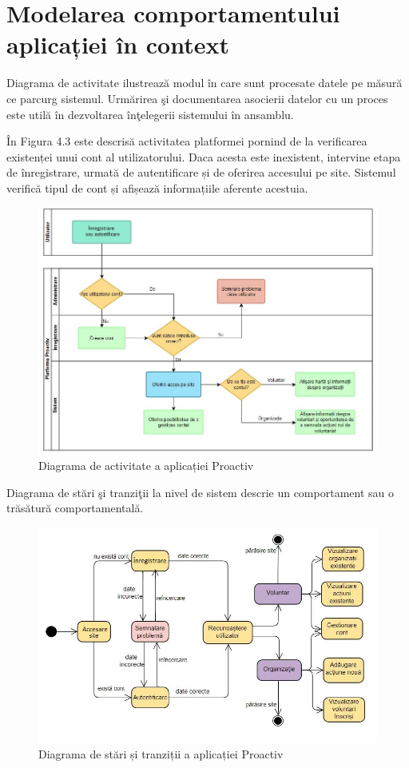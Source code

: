 \documentclass[12pt,a4paper]{report}
\begin{document}
\section{Modelarea comportamentului aplicației în context}
\par
Diagrama de activitate ilustrează modul în care sunt procesate datele pe măsură ce parcurg sistemul. Urmărirea şi documentarea asocierii datelor cu un proces este utilă în dezvoltarea înţelegerii sistemului în ansamblu.
\\
\par
În Figura 4.3 este descrisă activitatea platformei pornind de la verificarea existenței unui cont al utilizatorului. Daca acesta este inexistent, intervine etapa de înregistrare, urmată de autentificare și de oferirea accesului pe site. Sistemul verifică tipul de cont și afișează informațiile aferente acestuia.
\\
\begin{figure}[h!]
\centering
  \includegraphics[width=1\linewidth]{./imagini/swimlane.JPG}
  \caption{Diagrama de activitate a aplicației Proactiv}
\end{figure}

\newpage
\par
Diagrama de stări şi tranziţii la nivel de sistem descrie un comportament sau o trăsătură comportamentală. 

\begin{figure}[h!]
\centering
  \includegraphics[width=0.9\linewidth]{./imagini/stateMachine.JPG}
  \caption{Diagrama de stări și tranziții a aplicației Proactiv}
\end{figure}
\end{document}
